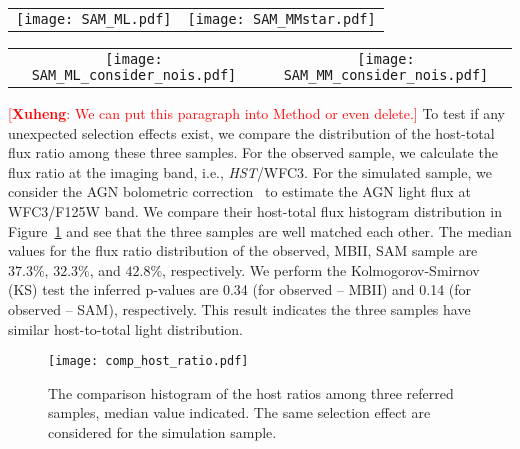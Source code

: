 \documentclass{natureprintstyle}
\newcommand{\hst}{{\it HST}}
\newcommand{\ding}[1]{\textcolor{red}{[{\bf Xuheng}: #1]}}
\begin{document}
\begin{figure*}[t]%
\begin{tabular}{c c}
\texttt{[image: SAM\_ML.pdf]} &
\texttt{[image: SAM\_MMstar.pdf]} \\
\end{tabular}
\caption{Similar to the Figure~\ref{fig:MBII_comp}, but for a direct comparison to the observation using SAM's model. The blue background contours show the possibility distribution for the overall sample, and the red contours indicate the distributions after considering the selecting effect. We presented our observational data as yellow dots. Note that this comparison has not taken the measurement uncertainties into account yet. 
}
\label{fig:SAM_comp}
\end{figure*}

\begin{figure*}[t]%
\begin{tabular}{c c}
\texttt{[image: SAM\_ML\_consider\_nois.pdf]} &
\texttt{[image: SAM\_MM\_consider\_nois.pdf]} \\
\end{tabular}
\caption{Same as the Figure~\ref{fig:MBII_comp}, but for the SAM models.}
\label{fig:SAM_comp_withnoise}
\end{figure*}

 \ding{We can put this paragraph into Method or even delete.} To test if any unexpected selection effects exist, we compare the distribution of the host-total flux ratio among these three samples. For the observed sample, we calculate the flux ratio at the imaging band, i.e., \hst/WFC3. For the simulated sample, we consider the AGN bolometric correction~\cite{Elvis1994} to estimate the AGN light flux at WFC3/F125W band. We compare their host-total flux histogram distribution in Figure~\ref{fig:comp_hist} and see that the three samples are well matched each other. The median values for the flux ratio distribution of the observed, MBII, SAM sample are $37.3\%$, $32.3\%$, and $42.8\%$, respectively. We perform the Kolmogorov-Smirnov (KS) test the inferred p-values are 0.34 (for observed -- MBII) and 0.14 (for observed -- SAM), respectively. This result indicates the three samples have similar host-to-total light distribution.

\begin{figure}[t]
\texttt{[image: comp\_host\_ratio.pdf]}
\caption{The comparison histogram of the host ratios among three referred samples, median value indicated. The same selection effect are considered for the simulation sample.
}
\label{fig:comp_hist}
\end{figure}
\end{document}
